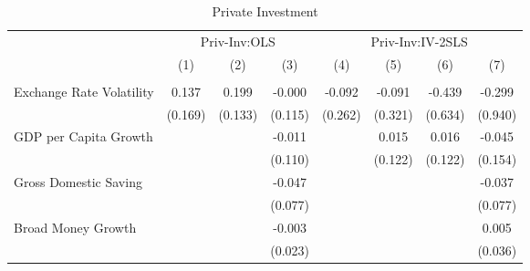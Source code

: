 \begin{table}[H] \def\sym#1{\ifmmode^{#1}\else\(^{#1}\)\fi} \caption{Private Investment} \begin{adjustbox}{max width=\textwidth} \begin{tabular}{l*{7}{c}} \\ \hline\hline
            &\multicolumn{3}{c}{Priv-Inv:OLS}                                 &\multicolumn{4}{c}{Priv-Inv:IV-2SLS}                                                   \\\cmidrule(lr){2-4}\cmidrule(lr){5-8}
            &\multicolumn{1}{c}{(1)}         &\multicolumn{1}{c}{(2)}         &\multicolumn{1}{c}{(3)}         &\multicolumn{1}{c}{(4)}         &\multicolumn{1}{c}{(5)}         &\multicolumn{1}{c}{(6)}         &\multicolumn{1}{c}{(7)}         \\
\hline \addlinespace \multicolumn{7}{l}{} \\  \addlinespace[2pt]
Exchange Rate Volatility&       0.137         &       0.199         &      -0.000         &      -0.092         &      -0.091         &      -0.439         &      -0.299         \\
            &     (0.169)         &     (0.133)         &     (0.115)         &     (0.262)         &     (0.321)         &     (0.634)         &     (0.940)         \\
\addlinespace
GDP per Capita Growth&                     &                     &      -0.011         &                     &       0.015         &       0.016         &      -0.045         \\
            &                     &                     &     (0.110)         &                     &     (0.122)         &     (0.122)         &     (0.154)         \\
\addlinespace
Gross Domestic Saving&                     &                     &      -0.047         &                     &                     &                     &      -0.037         \\
            &                     &                     &     (0.077)         &                     &                     &                     &     (0.077)         \\
\addlinespace
Broad Money Growth&                     &                     &      -0.003         &                     &                     &                     &       0.005         \\
            &                     &                     &     (0.023)         &                     &                     &                     &     (0.036)         \\

\end{tabular}
\end{adjustbox}
\end{table}
